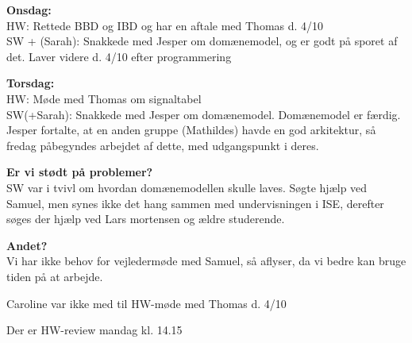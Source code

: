 \textbf{Onsdag: } \\
HW: Rettede BBD og IBD og har en aftale med Thomas d. 4/10 \\
SW + (Sarah): Snakkede med Jesper om domænemodel, og er godt på sporet af det. Laver videre d. 4/10 efter programmering

\textbf{Torsdag: } \\
HW: Møde med Thomas om signaltabel \\
SW(+Sarah): Snakkede med Jesper om domænemodel. Domænemodel er færdig. Jesper fortalte, at en anden gruppe (Mathildes) havde en god arkitektur, så fredag påbegyndes arbejdet af dette, med udgangspunkt i deres. 

\textbf{Er vi stødt på problemer? } \\
SW var i tvivl om hvordan domænemodellen skulle laves. Søgte hjælp ved Samuel, men synes ikke det hang sammen med undervisningen i ISE, derefter søges der hjælp ved Lars mortensen og ældre studerende. 

\textbf{Andet?} \\
Vi har ikke behov for vejledermøde med Samuel, så aflyser, da vi bedre kan bruge tiden på at arbejde. 

Caroline var ikke med til HW-møde med Thomas d. 4/10

Der er HW-review mandag kl. 14.15

\clearpage